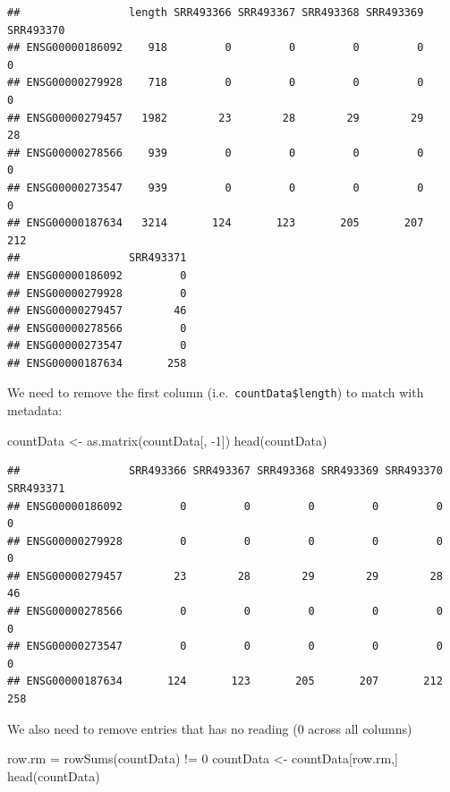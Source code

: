 \documentclass[
]{article}
\newenvironment{Shaded}{\begin{snugshade}}{\end{snugshade}}
\newcommand{\DecValTok}[1]{\textcolor[rgb]{0.00,0.00,0.81}{#1}}
\newcommand{\FunctionTok}[1]{\textcolor[rgb]{0.00,0.00,0.00}{#1}}
\newcommand{\NormalTok}[1]{#1}
\newcommand{\OtherTok}[1]{\textcolor[rgb]{0.56,0.35,0.01}{#1}}
\newcommand{\SpecialCharTok}[1]{\textcolor[rgb]{0.00,0.00,0.00}{#1}}
\begin{document}
\begin{verbatim}
##                 length SRR493366 SRR493367 SRR493368 SRR493369 SRR493370
## ENSG00000186092    918         0         0         0         0         0
## ENSG00000279928    718         0         0         0         0         0
## ENSG00000279457   1982        23        28        29        29        28
## ENSG00000278566    939         0         0         0         0         0
## ENSG00000273547    939         0         0         0         0         0
## ENSG00000187634   3214       124       123       205       207       212
##                 SRR493371
## ENSG00000186092         0
## ENSG00000279928         0
## ENSG00000279457        46
## ENSG00000278566         0
## ENSG00000273547         0
## ENSG00000187634       258
\end{verbatim}

We need to remove the first column (i.e.~\texttt{countData\$length}) to
match with metadata:

\begin{Shaded}
\begin{Highlighting}[]
\NormalTok{countData }\OtherTok{\textless{}{-}} \FunctionTok{as.matrix}\NormalTok{(countData[, }\SpecialCharTok{{-}}\DecValTok{1}\NormalTok{])}
\FunctionTok{head}\NormalTok{(countData)}
\end{Highlighting}
\end{Shaded}

\begin{verbatim}
##                 SRR493366 SRR493367 SRR493368 SRR493369 SRR493370 SRR493371
## ENSG00000186092         0         0         0         0         0         0
## ENSG00000279928         0         0         0         0         0         0
## ENSG00000279457        23        28        29        29        28        46
## ENSG00000278566         0         0         0         0         0         0
## ENSG00000273547         0         0         0         0         0         0
## ENSG00000187634       124       123       205       207       212       258
\end{verbatim}

We also need to remove entries that has no reading (0 across all
columns)

\begin{Shaded}
\begin{Highlighting}[]
\NormalTok{row.rm }\OtherTok{=} \FunctionTok{rowSums}\NormalTok{(countData) }\SpecialCharTok{!=} \DecValTok{0}
\NormalTok{countData }\OtherTok{\textless{}{-}}\NormalTok{ countData[row.rm,]}
\FunctionTok{head}\NormalTok{(countData)}
\end{Highlighting}
\end{Shaded}
\end{document}
